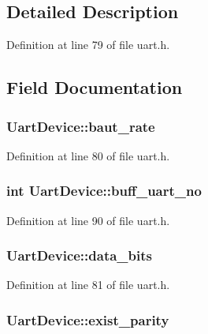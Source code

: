\subsection{Detailed Description}


Definition at line 79 of file uart.\-h.



\subsection{Field Documentation}
\hypertarget{structUartDevice_a1a6982e54a4c80d03248d97aa4e7f57c}{
\subsubsection[{baut\-\_\-rate}]{ Uart\-Device\-::baut\-\_\-rate}}\label{structUartDevice_a1a6982e54a4c80d03248d97aa4e7f57c}


Definition at line 80 of file uart.\-h.

\hypertarget{structUartDevice_af828558385d4b66a04288b5d631f0501}{
\subsubsection[{buff\-\_\-uart\-\_\-no}]{\setlength{\rightskip}{0pt plus 5cm}int Uart\-Device\-::buff\-\_\-uart\-\_\-no}}\label{structUartDevice_af828558385d4b66a04288b5d631f0501}


Definition at line 90 of file uart.\-h.

\hypertarget{structUartDevice_ae8f01df67cbdc9fad5e8b66fd03907d6}{
\subsubsection[{data\-\_\-bits}]{ Uart\-Device\-::data\-\_\-bits}}\label{structUartDevice_ae8f01df67cbdc9fad5e8b66fd03907d6}


Definition at line 81 of file uart.\-h.

\hypertarget{structUartDevice_ab0dbde04e07cf399428582ce9d8bc43d}{
\subsubsection[{exist\-\_\-parity}]{ Uart\-Device\-::exist\-\_\-parity}}\label{structUartDevice_ab0dbde04e07cf399428582ce9d8bc43d}


